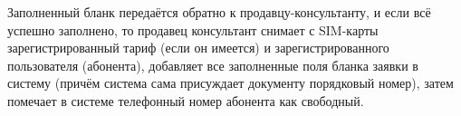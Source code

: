 Заполненный бланк передаётся обратно к продавцу-консультанту, и если всё успешно заполнено, то продавец консультант снимает с SIM-карты зарегистрированный тариф (если он имеется) и зарегистрированного пользователя (абонента), добавляет все заполненные поля бланка заявки в систему (причём система сама присуждает документу порядковый номер), затем помечает в системе телефонный номер абонента как свободный.





